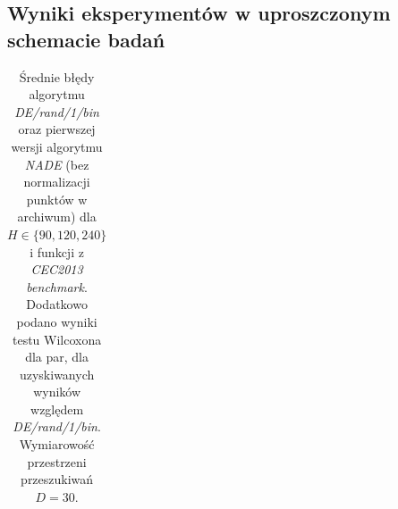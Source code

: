 \documentclass[12pt,a4paper]{report}
\begin{document}
{{{{{{{\begin{samepage}
\chapter{Wyniki eksperymentów w uproszczonym schemacie badań}
\label{ResultsAttachments}
\begin{table}[h]
\centering
\caption{
Średnie błędy algorytmu \emph{DE/rand/1/bin} oraz pierwszej wersji algorytmu \emph{NADE} (bez normalizacji punktów w archiwum) dla $H \in \{90, 120, 240\}$ i funkcji z \emph{CEC2013 benchmark}. Dodatkowo podano wyniki testu Wilcoxona dla par, dla uzyskiwanych wyników względem \emph{DE/rand/1/bin}. Wymiarowość przestrzeni przeszukiwań $D = 30$.
}
\par{\vphantom{10}}
\par{ }
\label{Eksp1}
\begin{tabular}{|l|l|l|l|l|}


\end{tabular}
\end{table}
\end{samepage}}}}}}}}
\end{document}
